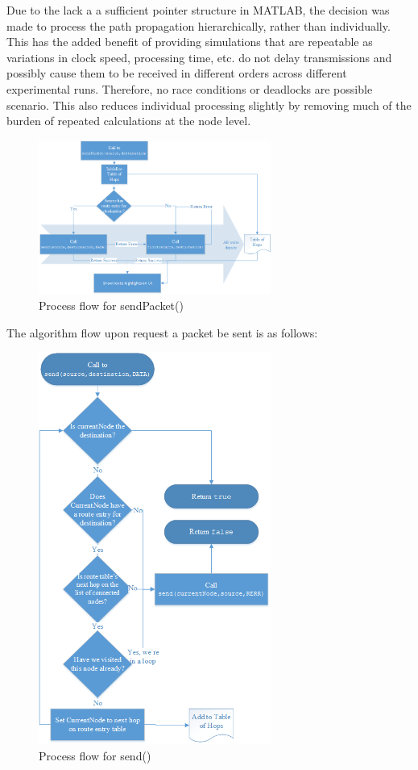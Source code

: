 \documentclass[conference]{IEEEtran}
\begin{document}
Due to the lack a a sufficient pointer structure in MATLAB, the decision was made to process the path propagation hierarchically, rather than individually. This has the added benefit of providing simulations that are repeatable as variations in clock speed, processing time, etc. do not delay transmissions and possibly cause them to be received in different orders across different experimental runs. Therefore, no race conditions or deadlocks are possible scenario. This also reduces individual processing slightly by removing much of the burden of repeated calculations at the node level.

\begin{figure}[ht]
	\centering
	\includegraphics[width=3in]{sendPacket.png}
	\caption{Process flow for sendPacket()}
	\label{fig:sendPacket}
\end{figure}

The algorithm flow upon request a packet be sent is as follows:

\begin{figure}[ht]
	\centering
	\includegraphics[width=3in]{send.png}
	\caption{Process flow for send()}
	\label{fig:send}
\end{figure}
\end{document}
